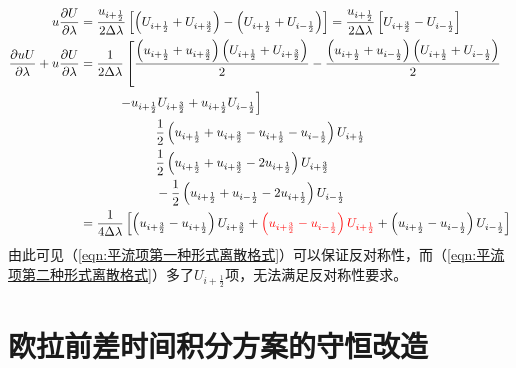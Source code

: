 \documentclass{ctexart}
\begin{document}
\begin{appendix}
\begin{align}
  u \frac{\partial U}{\partial \lambda} & = \frac{u_{i+\frac{1}{2}}}{2 \Delta{\lambda}} \left[ \left( U_{i+\frac{1}{2}} + U_{i+\frac{3}{2}} \right) - \left( U_{i+\frac{1}{2}} + U_{i-\frac{1}{2}} \right) \right] = \frac{u_{i+\frac{1}{2}}}{2 \Delta{\lambda}} \left[ U_{i+\frac{3}{2}} - U_{i-\frac{1}{2}} \right] \nonumber \\
  \frac{\partial u U}{\partial \lambda} + u \frac{\partial U}{\partial \lambda} & = \frac{1}{2 \Delta{\lambda}} \left[ \frac{\left( u_{i+\frac{1}{2}} + u_{i+\frac{3}{2}} \right) \left( U_{i+\frac{1}{2}} + U_{i+\frac{3}{2}} \right)}{2} - \frac{\left( u_{i+\frac{1}{2}} + u_{i-\frac{1}{2}} \right) \left( U_{i+\frac{1}{2}} + U_{i-\frac{1}{2}} \right)}{2} \right. \nonumber \\
  & \quad\quad\quad \left. - u_{i+\frac{1}{2}} U_{i+\frac{3}{2}} + u_{i+\frac{1}{2}} U_{i-\frac{1}{2}} \right] \nonumber \\
  & \quad\quad\quad\quad\quad\quad  \frac{1}{2} \left( u_{i+\frac{1}{2}} + u_{i+\frac{3}{2}} - u_{i+\frac{1}{2}} - u_{i-\frac{1}{2}} \right) U_{i+\frac{1}{2}} \nonumber \\{}
  & \quad\quad\quad\quad\quad\quad  \frac{1}{2} \left( u_{i+\frac{1}{2}} + u_{i+\frac{3}{2}} - 2 u_{i+\frac{1}{2}} \right) U_{i+\frac{3}{2}} \nonumber \\
  & \quad\quad\quad\quad\quad\quad  - \frac{1}{2} \left( u_{i+\frac{1}{2}} + u_{i-\frac{1}{2}} - 2 u_{i+\frac{1}{2}} \right) U_{i-\frac{1}{2}} \nonumber \\
  & = \frac{1}{4 \Delta{\lambda}} \left[ \left( u_{i+\frac{3}{2}} - u_{i+\frac{1}{2}} \right) U_{i+\frac{3}{2}} + {\color{red}\left( u_{i+\frac{3}{2}} - u_{i-\frac{1}{2}} \right) U_{i+\frac{1}{2}}} + \left( u_{i+\frac{1}{2}} - u_{i-\frac{1}{2}} \right) U_{i-\frac{1}{2}} \right] \label{eqn:平流项第二种形式离散格式}
\end{align}
由此可见（\ref{eqn:平流项第一种形式离散格式}）可以保证反对称性，而（\ref{eqn:平流项第二种形式离散格式}）多了$U_{i+\frac{1}{2}}$项，无法满足反对称性要求。

\section{欧拉前差时间积分方案的守恒改造}
\label{app:欧拉前差时间积分方案的守恒改造}


\end{appendix}
\end{document}
